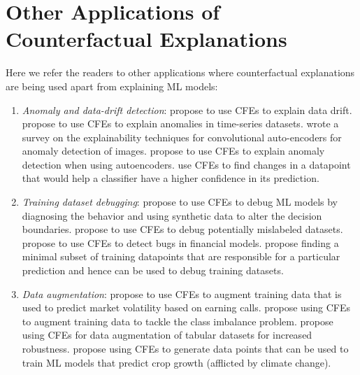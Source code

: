 \section{Other Applications of Counterfactual Explanations}
\label{sec:otherapplications}

Here we refer the readers to other applications where counterfactual explanations are being used apart from explaining ML models:
\begin{enumerate}
    \item \emph{Anomaly and data-drift detection}: \citet{hinder-cfe-drift} propose to use CFEs to explain data drift. \citet{sulem-cfe-time-series-anomaly-detection} propose to use CFEs to explain anomalies in time-series datasets. \citet{ravi-cfe-anomaly-detection} wrote a survey on the explainability techniques for convolutional auto-encoders for anomaly detection of images. \citet{cfe_anomaly_detection} propose to use CFEs to explain anomaly detection when using autoencoders. \citet{antoran2021-cfe-for-uncertainty-estimation} use CFEs to find changes in a datapoint that would help a classifier have a higher confidence in its prediction. 

    \item \emph{Training dataset debugging}: \citet{debugging-ml-models-cfe} propose to use CFEs to debug ML models by diagnosing the behavior and using synthetic data to alter the decision boundaries. \citet{debugging-data-cfe2} propose to use CFEs to debug potentially mislabeled datasets. \citet{cfe-financial-risk-debugging} propose to use CFEs to detect bugs in financial models. \citet{debugging-data-cfe3-han} propose finding a minimal subset of training datapoints that are responsible for a particular prediction and hence can be used to debug training datasets. 
    
    \item \emph{Data augmentation}: \citet{CFE-earning-call-data-augment} propose to use CFEs to augment training data that is used to predict market volatility based on earning calls. 
    \citet{CFE-classimbalance} propose using CFEs to augment training data to tackle the class imbalance problem. 
    \citet{hasan-cfe-augmentation-proximity,rasouli-cfe-robustness-tabular} propose using CFEs for data augmentation of tabular datasets for increased robustness. 
    \citet{temraz-cfe-data-augmentation-climate-change} propose using CFEs to generate data points that can be used to train ML models that predict crop growth (afflicted by climate change). 
    

\end{enumerate}
